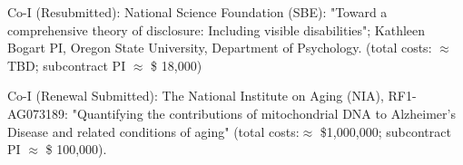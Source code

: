 \item Co-I (Resubmitted): National Science Foundation (SBE): "Toward a comprehensive theory of disclosure: Including visible disabilities"; Kathleen Bogart PI, Oregon State University, Department of Psychology.  (total costs: $\approx$ TBD; subcontract PI $\approx$ \$ 18,000) 

\item Co-I (Renewal Submitted): The National Institute on Aging (NIA), RF1-AG073189: "Quantifying the contributions of mitochondrial DNA to Alzheimer's Disease and related conditions of aging" (total costs:$\approx$ \$1,000,000; subcontract PI $\approx$ \$ 100,000).




%
%
